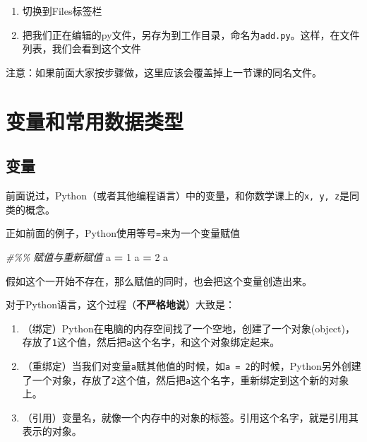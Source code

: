 \documentclass[
]{book}
\newenvironment{Shaded}{\begin{snugshade}}{\end{snugshade}}
\newcommand{\CommentTok}[1]{\textcolor[rgb]{0.56,0.35,0.01}{\textit{#1}}}
\newcommand{\DecValTok}[1]{\textcolor[rgb]{0.00,0.00,0.81}{#1}}
\newcommand{\NormalTok}[1]{#1}
\newcommand{\OperatorTok}[1]{\textcolor[rgb]{0.81,0.36,0.00}{\textbf{#1}}}
\providecommand{\tightlist}{%
  \setlength{\itemsep}{0pt}\setlength{\parskip}{0pt}}
\begin{document}
\begin{enumerate}
\def\labelenumi{\arabic{enumi}.}
\setcounter{enumi}{1}
\tightlist
\item
  切换到Files标签栏
\item
  把我们正在编辑的py文件，另存为到工作目录，命名为\texttt{add.py}。这样，在文件列表，我们会看到这个文件
\end{enumerate}

注意：如果前面大家按步骤做，这里应该会覆盖掉上一节课的同名文件。

\hypertarget{ux53d8ux91cfux548cux5e38ux7528ux6570ux636eux7c7bux578b}{%
\chapter{变量和常用数据类型}\label{ux53d8ux91cfux548cux5e38ux7528ux6570ux636eux7c7bux578b}}

\hypertarget{ux53d8ux91cf}{%
\section{变量}\label{ux53d8ux91cf}}

前面说过，Python（或者其他编程语言）中的变量，和你数学课上的\texttt{x,\ y,\ z}是同类的概念。

正如前面的例子，Python使用等号\texttt{=}来为一个变量赋值

\begin{Shaded}
\begin{Highlighting}[]
\CommentTok{\#\%\% 赋值与重新赋值}
\NormalTok{a }\OperatorTok{=} \DecValTok{1}
\NormalTok{a }\OperatorTok{=} \DecValTok{2}
\NormalTok{a}
\end{Highlighting}
\end{Shaded}

假如这个一开始不存在，那么赋值的同时，也会把这个变量创造出来。

对于Python语言，这个过程（\textbf{不严格地说}）大致是：

\begin{enumerate}
\def\labelenumi{\arabic{enumi}.}
\tightlist
\item
  （绑定）Python在电脑的内存空间找了一个空地，创建了一个对象(object)，存放了\texttt{1}这个值，然后把\texttt{a}这个名字，和这个对象绑定起来。
\item
  （重绑定）当我们对变量\texttt{a}赋其他值的时候，如\texttt{a\ =\ 2}的时候，Python另外创建了一个对象，存放了\texttt{2}这个值，然后把\texttt{a}这个名字，重新绑定到这个新的对象上。
\item
  （引用）变量名，就像一个内存中的对象的标签。引用这个名字，就是引用其表示的对象。
\end{enumerate}
\end{document}
